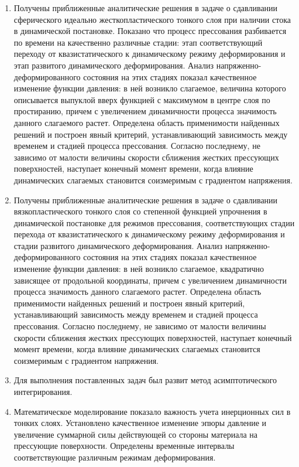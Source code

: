 \begin{enumerate}
  \item Получены приближенные аналитические решения в задаче о сдавливании сферического идеально жесткопластического тонкого слоя при наличии стока в динамической постановке. Показано что процесс прессования разбивается по времени на качественно различные стадии: этап соответствующий переходу от квазистатического к динамическому режиму деформирования и этап развитого динамического деформирования. Анализ напряженно-деформированного состояния на этих стадиях показал качественное изменение функции давления: в ней возникло слагаемое, величина которого описывается выпуклой вверх функцией с максимумом в центре слоя по простиранию, причем с увеличением динамичности процесса значимость данного слагаемого растет. Определена область применимости найденных решений и построен явный критерий, устанавливающий зависимость между временем и стадией процесса прессования.  Согласно последнему, не зависимо от малости величины скорости сближения жестких прессующих поверхностей, наступает конечный момент времени, когда влияние динамических слагаемых становится соизмеримым с градиентом напряжения.
  \item Получены приближенные аналитические решения в задаче о сдавливании вязкопластического тонкого слоя со степенной функцией упрочнения в динамической постановке для режимов прессования, соответствующих стадии перехода от квазистатического к динамическому режиму деформирования и стадии развитого динамического деформирования. Анализ напряженно-деформированного состояния на этих стадиях показал качественное изменение функции давления: в ней возникло слагаемое, квадратично зависящее от продольной координаты, причем с увеличением динамичности процесса значимость данного слагаемого растет. Определена область применимости найденных решений и построен явный критерий, устанавливающий зависимость между временем и стадией процесса прессования.  Согласно последнему, не зависимо от малости величины скорости сближения жестких прессующих поверхностей, наступает конечный момент времени, когда влияние динамических слагаемых становится соизмеримым с градиентом напряжения.
  \item Для выполнения поставленных задач был развит метод асимптотического интегрирования.
  \item Математическое моделирование показало важность учета инерционных сил в тонких слоях. Установлено качественное изменение эпюры давление и увеличение суммарной силы действующей со стороны материала на прессующие поверхности. Определены временные интервалы соответствующие различным режимам деформирования.
\end{enumerate}
